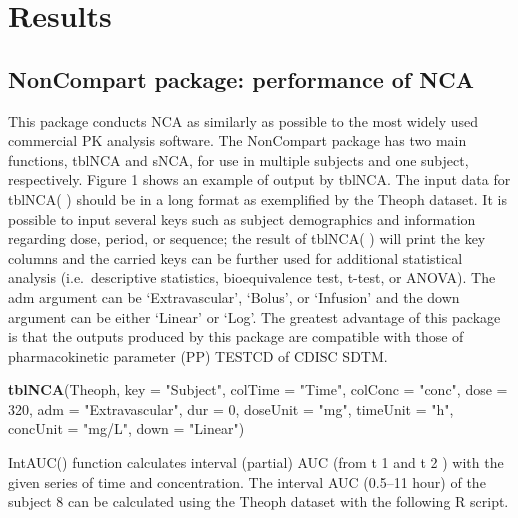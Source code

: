 \documentclass[12pt,]{krantz}
\newenvironment{Shaded}{\begin{snugshade}}{\end{snugshade}}
\newcommand{\KeywordTok}[1]{\textcolor[rgb]{0.13,0.29,0.53}{\textbf{#1}}}
\newcommand{\DataTypeTok}[1]{\textcolor[rgb]{0.13,0.29,0.53}{#1}}
\newcommand{\DecValTok}[1]{\textcolor[rgb]{0.00,0.00,0.81}{#1}}
\newcommand{\StringTok}[1]{\textcolor[rgb]{0.31,0.60,0.02}{#1}}
\newcommand{\NormalTok}[1]{#1}
\theoremstyle{definition}
\theoremstyle{definition}
\theoremstyle{definition}
\theoremstyle{remark}
\begin{document}
\chapter{Results}\label{results}

\section{NonCompart package: performance of
NCA}\label{noncompart-package-performance-of-nca}

This package conducts NCA as similarly as possible to the most widely
used commercial PK analysis software. The NonCompart package has two
main functions, tblNCA and sNCA, for use in multiple subjects and one
subject, respectively. Figure 1 shows an example of output by tblNCA.
The input data for tblNCA( ) should be in a long format as exemplified
by the Theoph dataset. It is possible to input several keys such as
subject demographics and information regarding dose, period, or
sequence; the result of tblNCA( ) will print the key columns and the
carried keys can be further used for additional statistical analysis
(i.e.~descriptive statistics, bioequivalence test, t-test, or ANOVA).
The adm argument can be `Extravascular', `Bolus', or `Infusion' and the
down argument can be either `Linear' or `Log'. The greatest advantage of
this package is that the outputs produced by this package are compatible
with those of pharmacokinetic parameter (PP) TESTCD of CDISC SDTM.

\begin{Shaded}
\begin{Highlighting}[]
\KeywordTok{tblNCA}\NormalTok{(Theoph, }\DataTypeTok{key =} \StringTok{"Subject"}\NormalTok{, }\DataTypeTok{colTime =} \StringTok{"Time"}\NormalTok{, }\DataTypeTok{colConc =} \StringTok{"conc"}\NormalTok{, }\DataTypeTok{dose =} \DecValTok{320}\NormalTok{, }
       \DataTypeTok{adm =} \StringTok{"Extravascular"}\NormalTok{, }\DataTypeTok{dur =} \DecValTok{0}\NormalTok{, }\DataTypeTok{doseUnit =} \StringTok{"mg"}\NormalTok{, }\DataTypeTok{timeUnit =} \StringTok{"h"}\NormalTok{, }\DataTypeTok{concUnit =} \StringTok{"mg/L"}\NormalTok{, }
       \DataTypeTok{down =} \StringTok{"Linear"}\NormalTok{)}
\end{Highlighting}
\end{Shaded}

IntAUC() function calculates interval (partial) AUC (from t 1 and t 2 )
with the given series of time and concentration. The interval AUC
(0.5--11 hour) of the subject 8 can be calculated using the Theoph
dataset with the following R script.
\end{document}
